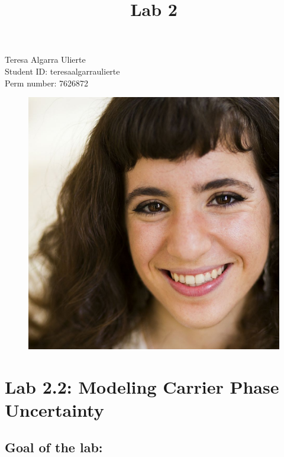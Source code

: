 \documentclass[a4paper,11pt]{article}
\title{\bfseries Lab 2 \\}
\date{}
\begin{document}
\renewcommand\contentsname{\vspace{-1cm}}
\maketitle
\lstset{language=Matlab}

\begin{centering}
    Teresa Algarra Ulierte \\
    Student ID: teresaalgarraulierte \\
    Perm number: 7626872 \\
\end{centering}

\vspace{3cm}

\begin{figure}[!ht]
	\centering
	\includegraphics[scale = 0.25]{images/photo.jpg}
\end{figure}

\newpage

\section{Lab 2.2: Modeling Carrier Phase Uncertainty}

\subsection{Goal of the lab:}
\end{document}
